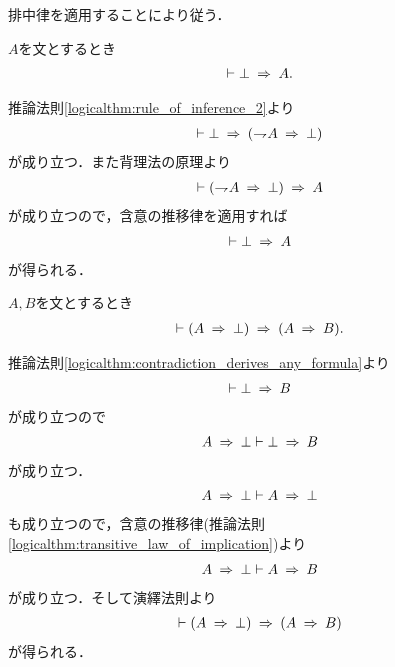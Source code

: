 	\begin{prf}
		排中律を適用することにより従う．
		\QED
	\end{prf}
	
	\begin{screen}
		\begin{logicalthm}
		\label{logicalthm:contradiction_derives_any_formula}
			$A$を文とするとき
			\begin{align}
				\vdash \bot \hspace{0.25em}\Rightarrow\hspace{0.25em} A.
			\end{align}
		\end{logicalthm}
	\end{screen}
	
	\begin{prf}
		推論法則\ref{logicalthm:rule_of_inference_2}より
		\begin{align}
			\vdash \bot \hspace{0.25em}\Rightarrow\hspace{0.25em} (\rightharpoondown\hspace{-0.25em} A \hspace{0.25em}\Rightarrow\hspace{0.25em} \bot)
		\end{align}
		が成り立つ．また背理法の原理より
		\begin{align}
			\vdash (\rightharpoondown\hspace{-0.25em} A \hspace{0.25em}\Rightarrow\hspace{0.25em} \bot) \hspace{0.25em}\Rightarrow\hspace{0.25em} A
		\end{align}
		が成り立つので，含意の推移律を適用すれば
		\begin{align}
			\vdash \bot \hspace{0.25em}\Rightarrow\hspace{0.25em} A
		\end{align}
		が得られる．
		\QED
	\end{prf}
	
	\begin{screen}
		\begin{logicalthm}[矛盾を導く式はあらゆる式を導く]\label{logicalthm:formula_leading_to_contradiction_derives_any_formula}
			$A,B$を文とするとき
			\begin{align}
				\vdash (A \hspace{0.25em}\Rightarrow\hspace{0.25em} \bot) \hspace{0.25em}\Rightarrow\hspace{0.25em} (A \hspace{0.25em}\Rightarrow\hspace{0.25em} B).
			\end{align}
		\end{logicalthm}
	\end{screen}
	
	\begin{prf}
		推論法則\ref{logicalthm:contradiction_derives_any_formula}より
		\begin{align}
			\vdash \bot \hspace{0.25em}\Rightarrow\hspace{0.25em} B
		\end{align}
		が成り立つので
		\begin{align}
			A \hspace{0.25em}\Rightarrow\hspace{0.25em} \bot \vdash \bot \hspace{0.25em}\Rightarrow\hspace{0.25em} B
		\end{align}
		が成り立つ．
		\begin{align}
			A \hspace{0.25em}\Rightarrow\hspace{0.25em} \bot \vdash A \hspace{0.25em}\Rightarrow\hspace{0.25em} \bot
		\end{align}
		も成り立つので，含意の推移律(推論法則\ref{logicalthm:transitive_law_of_implication})より
		\begin{align}
			A \hspace{0.25em}\Rightarrow\hspace{0.25em} \bot \vdash A \hspace{0.25em}\Rightarrow\hspace{0.25em} B
		\end{align}
		が成り立つ．そして演繹法則より
		\begin{align}
			\vdash (A \hspace{0.25em}\Rightarrow\hspace{0.25em} \bot) \hspace{0.25em}\Rightarrow\hspace{0.25em} (A \hspace{0.25em}\Rightarrow\hspace{0.25em} B)
		\end{align}
		が得られる．
		\QED
	\end{prf}
	
